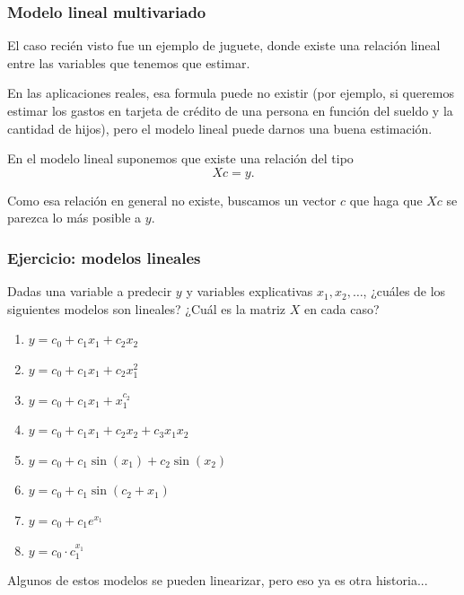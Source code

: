 \documentclass[aspectratio=169,12pt]{beamer}
\begin{document}

\begin{frame}
\frametitle{Modelo lineal multivariado}

El caso recién visto fue un ejemplo de juguete, donde existe una relación lineal entre las variables que tenemos que estimar.

En las aplicaciones reales, esa formula puede no existir (por ejemplo, si queremos estimar los gastos en tarjeta de crédito de una persona en
función del sueldo y la cantidad de hijos), pero el modelo lineal puede darnos una buena estimación.

En el modelo lineal suponemos que existe una relación del tipo
$$ X c = y.$$

Como esa relación en general no existe, buscamos un vector $c$ que haga que $X c$ se parezca lo más posible a $y$.

\end{frame}


\begin{frame}
\frametitle{Ejercicio: modelos lineales}

Dadas una variable a predecir $y$ y variables explicativas $x_1, x_2, \dots$, ¿cuáles de los siguientes modelos son lineales? ¿Cuál es la matriz $X$
en cada caso?

\begin{enumerate}
\item $y = c_0 + c_1 x_1 + c_2 x_2$
\item $y = c_0 + c_1 x_1 + c_2 x_1^2$
\item $y = c_0 + c_1 x_1 + x_1^{c_2}$
\item $y = c_0 + c_1 x_1 + c_2 x_2 + c_3 x_1 x_2$
\item $y = c_0 + c_1 \sin(x_1) + c_2 \sin(x_2)$
\item $y = c_0 + c_1 \sin(c_2 + x_1)$
\item $y = c_0 + c_1 e^{x_1}$
\item $y = c_0 \cdot c_1 ^{x_1}$
\end{enumerate}

\pause Algunos de estos modelos se pueden linearizar, pero eso ya es otra historia...
\end{frame}
\end{document}
